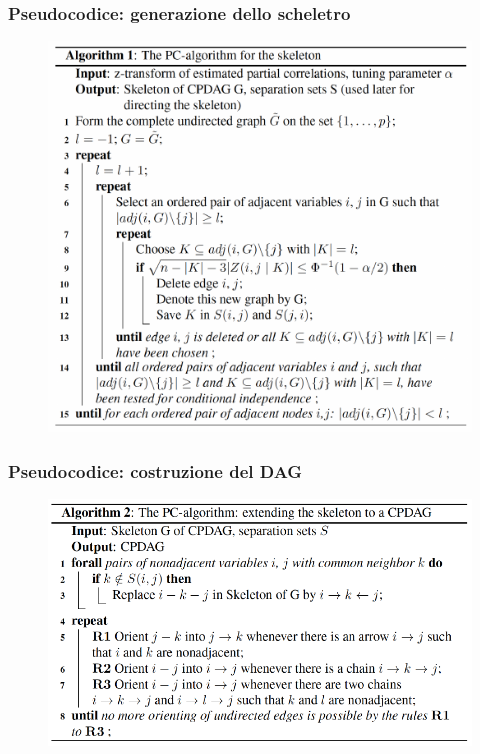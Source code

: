 \documentclass[xcolor ={table,usenames,dvipsnames}]{beamer}
\theoremstyle{definition}
\begin{document}
	\begin{frame}
		\frametitle{Pseudocodice: generazione dello scheletro}
		\begin{figure}[h!]
			\centering
			\includegraphics[scale=0.53]{img/pcalg.PNG}
			\label{Interfacce di un CS}
		\end{figure}
	\end{frame}

	\begin{frame}
		\frametitle{Pseudocodice: costruzione del DAG}
		\begin{figure}[h!]
			\centering
			\includegraphics[scale=0.5]{img/pcalg2.PNG}
			\label{Interfacce di un CS}
		\end{figure}
	\end{frame}
	
\end{document}
